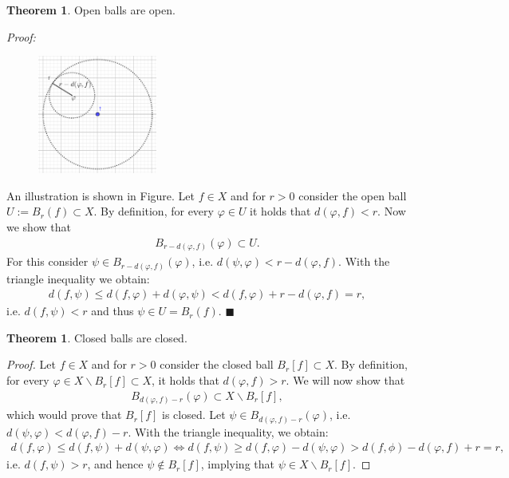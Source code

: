 \documentclass[12pt, a4paper]{article}
\numberwithin{equation}{section}
\theoremstyle{definition}
\theoremstyle{definition}
\newtheorem{theorem}[thm]{Theorem}
\begin{document}
	\begin{theorem}\label{open-balls-open}
		Open balls are open. 
	\end{theorem}
	\noindent\textit{Proof:}
	\begin{figure}[h!]
		\centering
		\includegraphics[width=0.35\textwidth]{Figures/open-balls-open.png}
	\end{figure}
	An illustration is shown in Figure. Let $f\in X$ and for $r > 0$ consider the open ball $U:= B_{r}(f) \subset X$. By definition, for every $\varphi \in U$ it holds that $d\left(\varphi, f\right) < r$. Now we show that 
	\begin{align}
		B_{r-d\left(\varphi, f\right)}(\varphi) \subset U.
	\end{align}
	For this consider $\psi\in B_{r-d\left(\varphi, f\right)}(\varphi)$, i.e. $d(\psi, \varphi) < r - d(\varphi, f)$. With the triangle inequality we obtain: 
	\begin{align}
		d(f, \psi) \leq d(f, \varphi) + d(\varphi, \psi) < d(f, \varphi) + r - d(\varphi, f) = r,  		
	\end{align}
	i.e. $d(f, \psi) < r$ and thus $\psi\in U = B_{r}(f)$.  \qquad\qquad\qquad\qquad\qquad\qquad\qquad\qquad\qquad\qquad\qquad\qquad\qquad\quad$\blacksquare$
	
	\begin{theorem}\label{thrm:closed_balls_open}
		Closed balls are closed.
	\end{theorem}
	
	\begin{proof}
		Let $f\in X$ and for $r > 0$ consider the closed ball $B_{r}[f]\subset X$. By definition, for every $\varphi \in X\backslash B_{r}[f]\subset X$, it holds that $d(\varphi, f) > r$. We will now show that 
		\begin{align}
			B_{d(\varphi, f) - r}(\varphi) \subset X \backslash B_{r}[f],
		\end{align}
		which would prove that $B_{r}[f]$ is closed. Let $\psi\in B_{d(\varphi, f) - r}(\varphi)$, i.e. $d(\psi, \varphi) < d(\varphi, f) -r$. With the triangle inequality, we obtain:
		\begin{align}
			d(f, \varphi) \leq d(f, \psi) + d(\psi, \varphi) \Leftrightarrow d(f, \psi) \geq d(f, \varphi) - d(\psi, \varphi) > d(f, \phi) - d(\varphi, f) + r = r, 
		\end{align}
		i.e. $d(f, \psi) > r$, and hence $\psi\notin B_r[f]$, implying that $\psi\in X\backslash B_{r}[f]$. 
	\end{proof}
	
\end{document}
